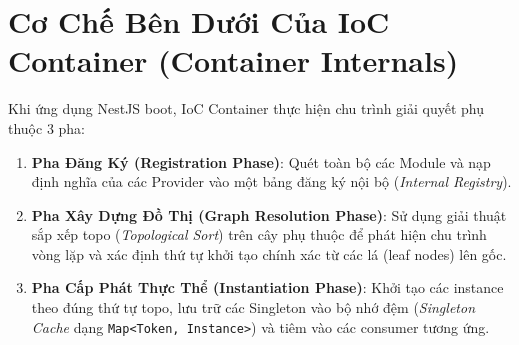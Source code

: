 \documentclass[12pt,a4paper,oneside]{book}
\begin{document}
\section{Cơ Chế Bên Dưới Của IoC Container (Container Internals)}
Khi ứng dụng NestJS boot, IoC Container thực hiện chu trình giải quyết phụ thuộc 3 pha:
\begin{enumerate}
  \item \textbf{Pha Đăng Ký (Registration Phase)}: Quét toàn bộ các Module và nạp định nghĩa của các Provider vào một bảng đăng ký nội bộ (\textit{Internal Registry}).
  \item \textbf{Pha Xây Dựng Đồ Thị (Graph Resolution Phase)}: Sử dụng giải thuật sắp xếp topo (\textit{Topological Sort}) trên cây phụ thuộc để phát hiện chu trình vòng lặp và xác định thứ tự khởi tạo chính xác từ các lá (leaf nodes) lên gốc.
  \item \textbf{Pha Cấp Phát Thực Thể (Instantiation Phase)}: Khởi tạo các instance theo đúng thứ tự topo, lưu trữ các Singleton vào bộ nhớ đệm (\textit{Singleton Cache} dạng \texttt{Map<Token, Instance>}) và tiêm vào các consumer tương ứng.
\end{enumerate}
\end{document}
